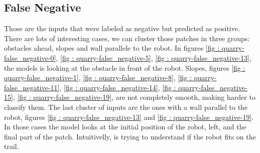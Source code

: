 \documentclass[../document.tex]{subfiles}
\begin{document}
\subsection{False Negative}
Those are the inputs that were labeled as negative but predicted as positive. There are lots of interesting cases, we can cluster those patches in three groups: obstacles ahead, slopes and wall parallele to the robot. In figures \ref{fig : quarry-false_negative-0}, \ref{fig : quarry-false_negative-5}, \ref{fig : quarry-false_negative-13}, the models is looking at the obstacle in front of the robot.  Slopes, figures \ref{fig : quarry-false_negative-1}, \ref{fig : quarry-false_negative-8}, \ref{fig : quarry-false_negative-11}, \ref{fig : quarry-false_negative-14}, \ref{fig : quarry-false_negative-15}, \ref{fig : quarry-false_negative-19}, are not completely smooth, making harder to classify them. The last cluster of inputs are the ones with a wall parallel to the robot, figures \ref{fig : quarry-false_negative-13} and \ref{fig : quarry-false_negative-19}. In those cases the model looks at the initial position of the robot, left, and the final part of the patch. Intuitivelly, is trying to understand if the robot fits on the trail. 
\end{document}
